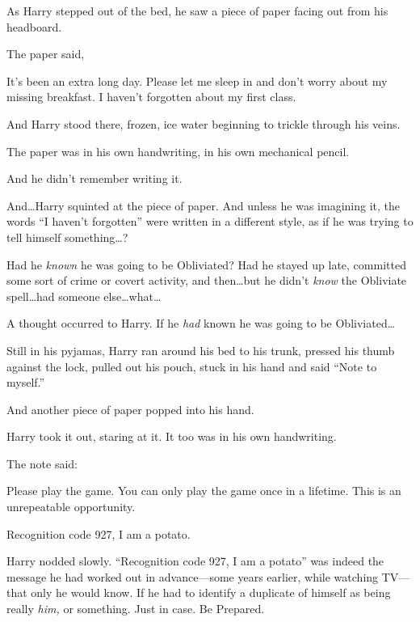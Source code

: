 As Harry stepped out of the bed, he saw a piece of paper facing out from his headboard.

The paper said,

\begin{writtenNote}

It’s been an extra long day. Please let me sleep in and don’t worry about my missing breakfast. I haven’t forgotten about my first class.

\end{writtenNote}

And Harry stood there, frozen, ice water beginning to trickle through his veins.

The paper was in his own handwriting, in his own mechanical pencil.

And he didn’t remember writing it.

And…Harry squinted at the piece of paper. And unless he was imagining it, the words “I haven’t forgotten” were written in a different style, as if he was trying to tell himself something…?

Had he \emph{known} he was going to be Obliviated? Had he stayed up late, committed some sort of crime or covert activity, and then…but he didn’t \emph{know} the Obliviate spell…had someone else…what…

A thought occurred to Harry. If he \emph{had} known he was going to be Obliviated…

Still in his pyjamas, Harry ran around his bed to his trunk, pressed his thumb against the lock, pulled out his pouch, stuck in his hand and said “Note to myself.”

And another piece of paper popped into his hand.

Harry took it out, staring at it. It too was in his own handwriting.

The note said:

\begin{writtenNote}

Please play the game. You can only play the game once in a lifetime. This is an unrepeatable opportunity.

Recognition code 927, I am a potato.

\end{writtenNote}

Harry nodded slowly. “Recognition code 927, I am a potato” was indeed the message he had worked out in advance—some years earlier, while watching TV—that only he would know. If he had to identify a duplicate of himself as being really \emph{him,} or something. Just in case. Be Prepared.

